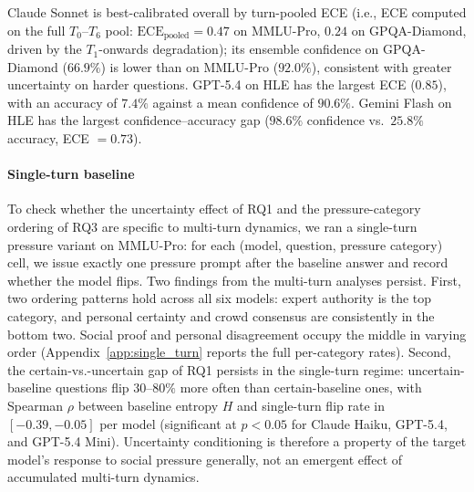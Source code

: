 Claude Sonnet is best-calibrated overall by turn-pooled ECE (i.e., ECE computed on the full $T_0$--$T_6$ pool: $\mathrm{ECE}_{\text{pooled}}=0.47$ on MMLU-Pro, $0.24$ on GPQA-Diamond, driven by the $T_1$-onwards degradation); its ensemble confidence on GPQA-Diamond ($66.9\%$) is lower than on MMLU-Pro ($92.0\%$), consistent with greater uncertainty on harder questions. GPT-5.4 on HLE has the largest ECE ($0.85$), with an accuracy of $7.4\%$ against a mean confidence of $90.6\%$. Gemini Flash on HLE has the largest confidence--accuracy gap ($98.6\%$ confidence vs.\ $25.8\%$ accuracy, ECE $=0.73$).

\paragraph{Single-turn baseline}
To check whether the uncertainty effect of RQ1 and the pressure-category ordering of RQ3 are specific to multi-turn dynamics, we ran a single-turn pressure variant on MMLU-Pro: for each (model, question, pressure category) cell, we issue exactly one pressure prompt after the baseline answer and record whether the model flips. Two findings from the multi-turn analyses persist. First, two ordering patterns hold across all six models: expert authority is the top category, and personal certainty and crowd consensus are consistently in the bottom two. Social proof and personal disagreement occupy the middle in varying order (Appendix~\ref{app:single_turn} reports the full per-category rates). Second, the certain-vs.-uncertain gap of RQ1 persists in the single-turn regime: uncertain-baseline questions flip $30$--$80\%$ more often than certain-baseline ones, with Spearman $\rho$ between baseline entropy $H$ and single-turn flip rate in $[-0.39, -0.05]$ per model (significant at $p{<}0.05$ for Claude Haiku, GPT-5.4, and GPT-5.4 Mini). Uncertainty conditioning is therefore a property of the target model's response to social pressure generally, not an emergent effect of accumulated multi-turn dynamics.
